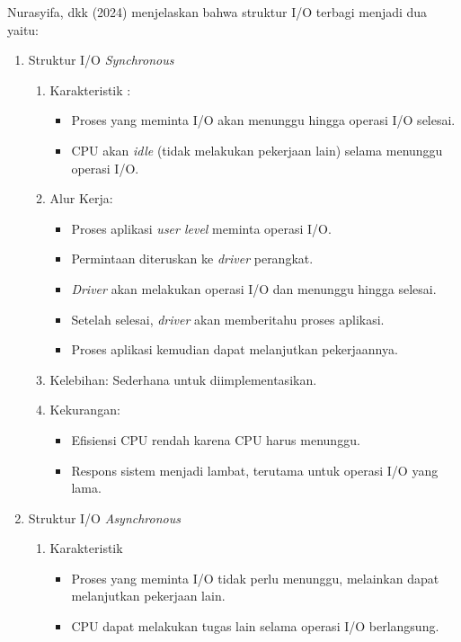\documentclass[12pt]{article}
\begin{document}
Nurasyifa, dkk (2024) menjelaskan bahwa struktur I/O terbagi menjadi dua yaitu:
\begin{enumerate}
    \item Struktur I/O \emph{Synchronous} 
    \begin{enumerate}
        \item Karakteristik :
        \begin{itemize}
            \item Proses yang meminta I/O akan menunggu hingga operasi I/O selesai.
            \item CPU akan \emph{idle} (tidak melakukan pekerjaan lain) selama menunggu operasi I/O.
        \end{itemize}
        \item Alur Kerja:
        \begin{itemize}
            \item Proses aplikasi \emph{user level} meminta operasi I/O.
            \item Permintaan diteruskan ke \textit{driver} perangkat.
            \item \textit{Driver} akan melakukan operasi I/O dan menunggu hingga selesai.
            \item Setelah selesai, \textit{driver} akan memberitahu proses aplikasi.
            \item Proses aplikasi kemudian dapat melanjutkan pekerjaannya.
        \end{itemize}
        \item Kelebihan: Sederhana untuk diimplementasikan.
        \item Kekurangan:
        \begin{itemize}
            \item Efisiensi CPU rendah karena CPU harus menunggu.
            \item Respons sistem menjadi lambat, terutama untuk operasi I/O yang lama.    
        \end{itemize}
    \end{enumerate}

    \item Struktur I/O \emph{Asynchronous}
    \begin{enumerate}
        \item Karakteristik
        \begin{itemize}
            \item Proses yang meminta I/O tidak perlu menunggu, melainkan dapat melanjutkan pekerjaan lain.
            \item CPU dapat melakukan tugas lain selama operasi I/O berlangsung.  
        \end{itemize}


\end{enumerate}
\end{enumerate}
\end{document}
